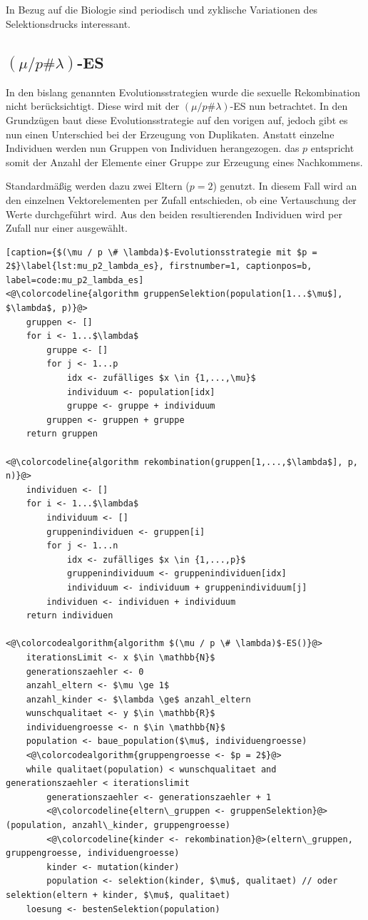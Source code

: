 In Bezug auf die Biologie sind periodisch und zyklische Variationen des Selektionsdrucks interessant.

\subsection{$(\mu / p \# \lambda)$-ES}

In den bislang genannten Evolutionsstrategien wurde die sexuelle Rekombination nicht berücksichtigt.
Diese wird mit der $(\mu / p \# \lambda)$-ES nun betrachtet.
In den Grundzügen baut diese Evolutionsstrategie auf den vorigen auf, jedoch gibt es nun einen Unterschied bei der Erzeugung von Duplikaten.
Anstatt einzelne Individuen werden nun Gruppen von Individuen herangezogen.
das $p$ entspricht somit der Anzahl der Elemente einer Gruppe zur Erzeugung eines Nachkommens.

Standardmäßig werden dazu zwei Eltern ($p = 2$) genutzt.
In diesem Fall wird an den einzelnen Vektorelementen per Zufall entschieden, ob eine Vertauschung der Werte durchgeführt wird.
Aus den beiden resultierenden Individuen wird per Zufall nur einer ausgewählt.

\begin{lstlisting}[caption={$(\mu / p \# \lambda)$-Evolutionsstrategie mit $p = 2$}\label{lst:mu_p2_lambda_es}, firstnumber=1, captionpos=b, label=code:mu_p2_lambda_es]
<@\colorcodeline{algorithm gruppenSelektion(population[1...$\mu$], $\lambda$, p)}@>
	gruppen <- []
	for i <- 1...$\lambda$
		gruppe <- []
		for j <- 1...p
			idx <- zufälliges $x \in {1,...,\mu}$
			individuum <- population[idx]
			gruppe <- gruppe + individuum
		gruppen <- gruppen + gruppe
	return gruppen

<@\colorcodeline{algorithm rekombination(gruppen[1,...,$\lambda$], p, n)}@>
	individuen <- []
	for i <- 1...$\lambda$
		individuum <- []
		gruppenindividuen <- gruppen[i]
		for j <- 1...n
			idx <- zufälliges $x \in {1,...,p}$
			gruppenindividuum <- gruppenindividuen[idx]
			individuum <- individuum + gruppenindividuum[j]
		individuen <- individuen + individuum
	return individuen

<@\colorcodealgorithm{algorithm $(\mu / p \# \lambda)$-ES()}@>
	iterationsLimit <- x $\in \mathbb{N}$
	generationszaehler <- 0
	anzahl_eltern <- $\mu \ge 1$
	anzahl_kinder <- $\lambda \ge$ anzahl_eltern
	wunschqualitaet <- y $\in \mathbb{R}$
	individuengroesse <- n $\in \mathbb{N}$
	population <- baue_population($\mu$, individuengroesse)
	<@\colorcodealgorithm{gruppengroesse <- $p = 2$}@>
	while qualitaet(population) < wunschqualitaet and generationszaehler < iterationslimit
		generationszaehler <- generationszaehler + 1
		<@\colorcodeline{eltern\_gruppen <- gruppenSelektion}@>(population, anzahl\_kinder, gruppengroesse)
		<@\colorcodeline{kinder <- rekombination}@>(eltern\_gruppen, gruppengroesse, individuengroesse)
		kinder <- mutation(kinder)
		population <- selektion(kinder, $\mu$, qualitaet) // oder selektion(eltern + kinder, $\mu$, qualitaet)
	loesung <- bestenSelektion(population)
\end{lstlisting}


